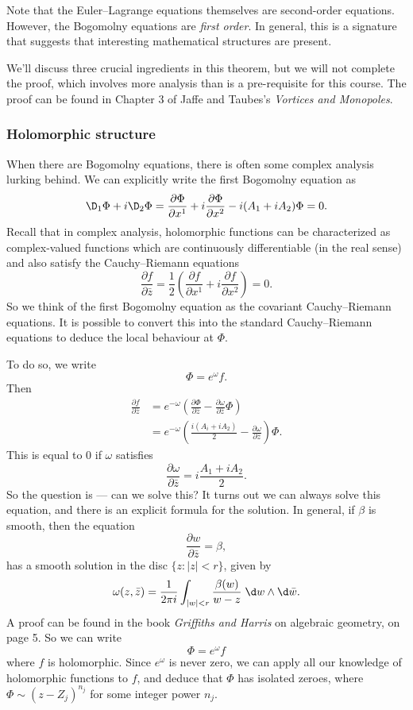 \documentclass[a4paper]{article}
\begin{document}
Note that the Euler--Lagrange equations themselves are second-order equations. However, the Bogomolny equations are \emph{first order}. In general, this is a signature that suggests that interesting mathematical structures are present.

We'll discuss three crucial ingredients in this theorem, but we will not complete the proof, which involves more analysis than is a pre-requisite for this course. The proof can be found in Chapter 3 of Jaffe and Taubes's \emph{Vortices and Monopoles}.

\subsubsection*{Holomorphic structure}
When there are Bogomolny equations, there is often some complex analysis lurking behind. We can explicitly write the first Bogomolny equation as
\[
  \D_1 \Phi + i \D_2 \Phi = \frac{\partial \Phi}{\partial x^1} + i\frac{\partial \Phi}{\partial x^2} - i(A_1 + i A_2) \Phi = 0.
\]
Recall that in complex analysis, holomorphic functions can be characterized as complex-valued functions which are continuously differentiable (in the real sense) and also satisfy the Cauchy--Riemann equations
\[
  \frac{\partial f}{\partial \bar{z}} = \frac{1}{2} \left(\frac{\partial f}{\partial x^1} + i \frac{\partial f}{\partial x^2}\right) = 0.
\]
So we think of the first Bogomolny equation as the covariant Cauchy--Riemann equations. It is possible to convert this into the standard Cauchy--Riemann equations to deduce the local behaviour at $\Phi$.

To do so, we write
\[
  \Phi = e^{\omega} f.
\]
Then
\begin{align*}
  \frac{\partial f}{\partial \bar{z}} &= e^{-\omega} \left(\frac{\partial \Phi}{\partial \bar{z}} - \frac{\partial \omega}{\partial \bar{z}} \Phi\right)\\
  &= e^{-\omega} \left(\frac{i(A_i + i A_2)}{2} - \frac{\partial \omega}{\partial \bar{z}}\right)\Phi.
\end{align*}
This is equal to $0$ if $\omega$ satisfies
\[
  \frac{\partial \omega}{\partial \bar{z}} = i \frac{A_1 + iA_2}{2}.
\]
So the question is --- can we solve this? It turns out we can always solve this equation, and there is an explicit formula for the solution. In general, if $\beta$ is smooth, then the equation
\[
  \frac{\partial w}{\partial \bar{z}} = \beta,
\]
has a smooth solution in the disc $\{z: |z| < r\}$, given by
\[
  \omega(z, \bar{z}) = \frac{1}{2\pi i} \int_{|w| < r} \frac{\beta(w)}{w - z}\;\d w \wedge \d \bar{w}.
\]
A proof can be found in the book \emph{Griffiths and Harris} on algebraic geometry, on page 5. So we can write
\[
  \Phi = e^{\omega} f
\]
where $f$ is holomorphic. Since $e^{\omega}$ is never zero, we can apply all our knowledge of holomorphic functions to $f$, and deduce that $\Phi$ has isolated zeroes, where $\Phi \sim (z - Z_j)^{n_j}$ for some integer power $n_j$.
\end{document}
